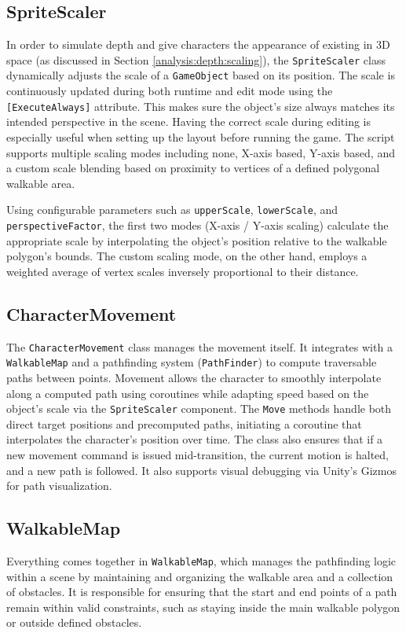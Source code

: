 \subsection{SpriteScaler}
In order to simulate depth and give characters the appearance of existing in 3D space (as discussed in Section \ref{analysis:depth:scaling}), the \verb|SpriteScaler| class dynamically adjusts the scale of a \verb|GameObject| based on its position.  The scale is continuously updated during both runtime and edit mode using the \verb|[ExecuteAlways]| attribute. This makes sure the object's size always matches its intended perspective in the scene. Having the correct scale during editing is especially useful when setting up the layout before running the game. The script supports multiple scaling modes including none, X-axis based, Y-axis based, and a custom scale blending based on proximity to vertices of a defined polygonal walkable area.

Using configurable parameters such as \verb|upperScale|, \verb|lowerScale|, and \verb|perspectiveFactor|, the first two modes (X-axis / Y-axis scaling)  calculate the appropriate scale by interpolating the object's position relative to the walkable polygon’s bounds. The custom scaling mode, on the other hand, employs a weighted average of vertex scales inversely proportional to their distance. 


\subsection{CharacterMovement}
The \verb|CharacterMovement| class manages the movement itself. It integrates with a \verb|WalkableMap| and a pathfinding system (\verb|PathFinder|) to compute traversable paths between points. Movement allows the character to smoothly interpolate along a computed path using coroutines while adapting speed based on the object's scale via the \verb|SpriteScaler| component. The \verb|Move| methods handle both direct target positions and precomputed paths, initiating a coroutine that interpolates the character’s position over time. The class also ensures that if a new movement command is issued mid-transition, the current motion is halted, and a new path is followed. It also supports visual debugging via Unity’s Gizmos for path visualization.

 
\subsection{WalkableMap}
Everything comes together in \verb|WalkableMap|, which manages the pathfinding logic within a scene by maintaining and organizing the walkable area and a collection of obstacles. It is responsible for ensuring that the start and end points of a path remain within valid constraints, such as staying inside the main walkable polygon or outside defined obstacles.

